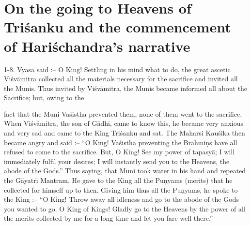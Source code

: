 \chapter{On the going to Heavens of Tri\'sanku and the commencement of Hari\'schandra's narrative}

1-8. Vy\=asa said :-- O King! Settling in his mind what to do, the great ascetic Vi\'sv\=amitra collected all the materials necessary for the sacrifice and invited all the Munis. Thus invited by Vi\'sv\=amitra, the Munis became informed all about the Sacrifice; but, owing to the

fact that the Muni Va\'sistha prevented them, none of them went to the sacrifice. When Vi\'sv\=amitra, the son of G\=adhi, came to know this, he became very anxious and very sad and came to the King Tri\'sanku and sat. The Maharsi Kau\'sika then became angry and said :-- ``O King! Va\'sistha preventing the Br\=ahmi\d{n}s have all refused to come to the sacrifice. But, O King! See my power of tapasy\=a; I will immediately fulfil your desires; I will instantly send you to the Heavens, the abode of the Gods.'' Thus saying, that Muni took water in his hand and repeated the G\=ayatr\={\i} Mantram. He gave to the King all the Pu\d{n}yams (merits) that he collected for himself up to then. Giving him thus all the Pu\d{n}yams, he spoke to the King :-- ``O King! Throw away all idleness and go to the abode of the Gods you wanted to go. O King of Kings! Gladly go to the Heavens by the power of all the merits collected by me for a long time and let you fare well there.''


